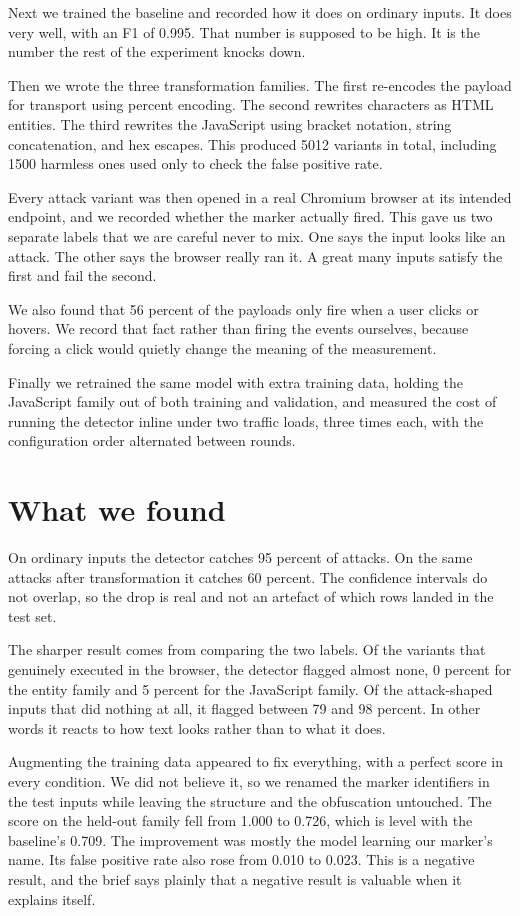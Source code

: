 \documentclass[11pt,a4paper]{article}
\begin{document}
Next we trained the baseline and recorded how it does on ordinary inputs. It does very
well, with an F1 of 0.995. That number is supposed to be high. It is the number the rest of
the experiment knocks down.

Then we wrote the three transformation families. The first re-encodes the payload for
transport using percent encoding. The second rewrites characters as HTML entities. The
third rewrites the JavaScript using bracket notation, string concatenation, and hex
escapes. This produced 5012 variants in total, including 1500 harmless ones used only to
check the false positive rate.

Every attack variant was then opened in a real Chromium browser at its intended endpoint,
and we recorded whether the marker actually fired. This gave us two separate labels that we
are careful never to mix. One says the input looks like an attack. The other says the
browser really ran it. A great many inputs satisfy the first and fail the second.

We also found that 56 percent of the payloads only fire when a user clicks or hovers. We
record that fact rather than firing the events ourselves, because forcing a click would
quietly change the meaning of the measurement.

Finally we retrained the same model with extra training data, holding the JavaScript family
out of both training and validation, and measured the cost of running the detector inline
under two traffic loads, three times each, with the configuration order alternated between
rounds.

\section{What we found}

On ordinary inputs the detector catches 95 percent of attacks. On the same attacks after
transformation it catches 60 percent. The confidence intervals do not overlap, so the drop
is real and not an artefact of which rows landed in the test set.

The sharper result comes from comparing the two labels. Of the variants that genuinely
executed in the browser, the detector flagged almost none, 0 percent for the entity family
and 5 percent for the JavaScript family. Of the attack-shaped inputs that did nothing at
all, it flagged between 79 and 98 percent. In other words it reacts to how text looks
rather than to what it does.

Augmenting the training data appeared to fix everything, with a perfect score in every
condition. We did not believe it, so we renamed the marker identifiers in the test inputs
while leaving the structure and the obfuscation untouched. The score on the held-out family
fell from 1.000 to 0.726, which is level with the baseline's 0.709. The improvement was
mostly the model learning our marker's name. Its false positive rate also rose from 0.010
to 0.023. This is a negative result, and the brief says plainly that a negative result is
valuable when it explains itself.
\end{document}
